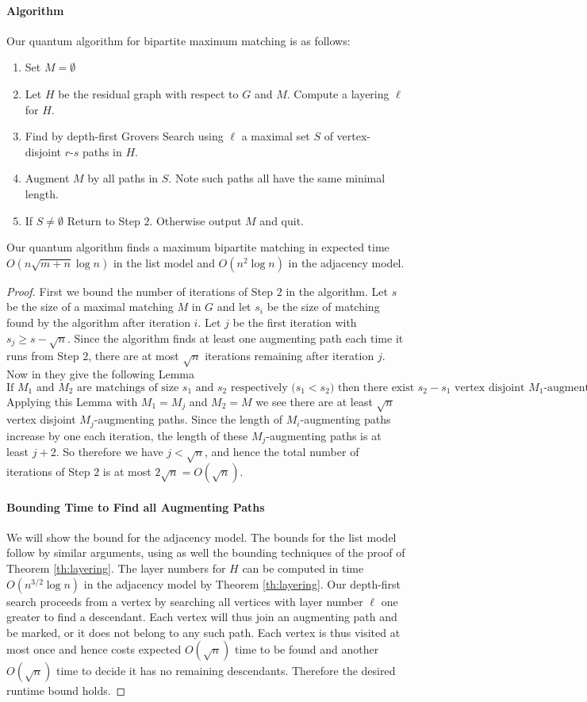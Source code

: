 \paragraph{Algorithm}
Our quantum algorithm for bipartite maximum matching is as follows:
\begin{enumerate}
\item Set $M = \emptyset$
\item  Let $H$ be the residual graph with respect to $G$ and $M$. Compute a layering $\ell$ for $H$.
\item Find by depth-first Grovers Search using $\ell$ a maximal set $S$ of vertex-disjoint $r$-$s$ paths in $H$.
\item Augment $M$ by all paths in $S$. Note such paths all have the same minimal length.
\item If $S\neq \emptyset$ Return to Step $2$. Otherwise output $M$ and quit.
\end{enumerate} 
\begin{theorem}
Our quantum algorithm finds a maximum bipartite matching in expected time $O(n\sqrt{m+n}\log n)$ in the list model and $O(n^2\log n)$ in the adjacency model.
\end{theorem}
\begin{proof}
First we bound the number of iterations of Step $2$ in the algorithm. Let $s$ be the size of a maximal matching $M$ in $G$ and let $s_i$ be the size of matching found by the algorithm after iteration $i$.  Let $j$ be the first iteration with $s_j \geq s-\sqrt{n}$. Since the algorithm finds at least one augmenting path each time it runs from Step $2$, there are at most $\sqrt{n}$ iterations remaining after iteration $j$.  Now in \cite{hopkroft1973n5} they give the following Lemma
$$\text{If $M_1$ and $M_2$ are matchings of size $s_1$ and $s_2$ respectively ($s_1 < s_2$) then there exist $s_2-s_1$ vertex disjoint $M_1$-augmenting paths.}$$
Applying this Lemma with $M_1 = M_j$ and $M_2 = M$ we see there are at least $\sqrt{n}$ vertex disjoint $M_j$-augmenting paths. Since the length of $M_i$-augmenting paths increase by one each iteration, the length of these $M_j$-augmenting paths is at least $j+2$. So therefore we have $j <\sqrt{n}$, and hence the total number of iterations of Step $2$ is at most $2\sqrt{n} = O(\sqrt{n})$.
\paragraph{Bounding Time to Find all Augmenting Paths}
We will show the bound for the adjacency model. The bounds for the list model follow by similar arguments, using as well the bounding techniques of the proof of Theorem \ref{th:layering}. The layer numbers for $H$ can be computed in time $O(n^{3/2}\log n)$ in the adjacency model by Theorem \ref{th:layering}. Our depth-first search proceeds from a vertex by searching all vertices with layer number $\ell$ one greater to find a descendant. Each vertex will thus join an augmenting path and be marked, or it does not belong to any such path. Each vertex is thus visited at most once and hence costs expected $O(\sqrt{n})$ time to be found and another $O(\sqrt{n})$ time to decide it has no remaining descendants. Therefore the desired runtime bound holds.
\end{proof}
